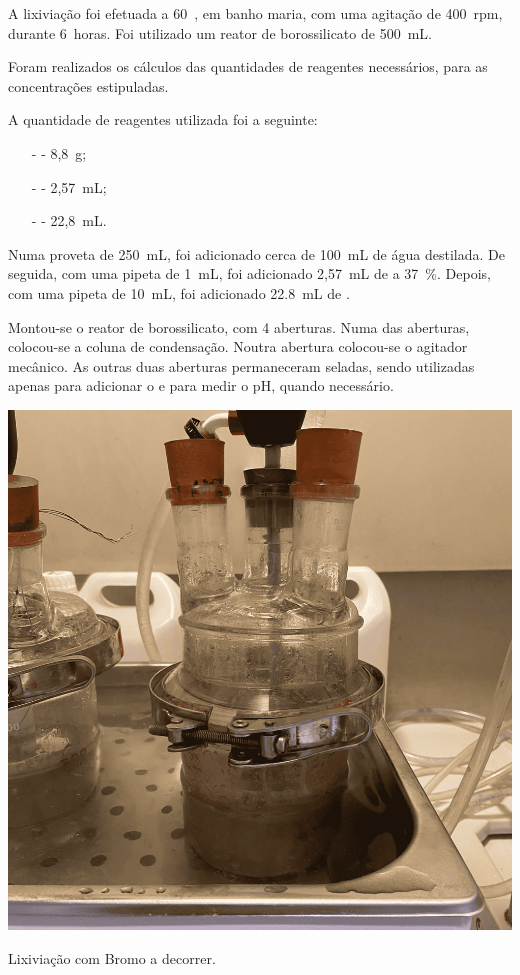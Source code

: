 {A lixiviação foi efetuada a 60~\graus{}, em banho maria, com uma agitação de 400~rpm, durante 6~horas.
Foi utilizado um reator de borossilicato de 500~mL.

Foram realizados os cálculos das quantidades de reagentes necessários, para as concentrações estipuladas. 

A quantidade de reagentes utilizada foi a seguinte:
\begin{itemize}
    \item[-] \bromo{} - 8,8~g;
    \item[-] \acl{} - 2,57~mL;
    \item[-] \hipso{} - 22,8~mL.
\end{itemize}

Numa proveta de 250~mL, foi adicionado cerca de 100~mL de água destilada.
De seguida, com uma pipeta de 1~mL, foi adicionado 2,57~mL de \acl{} a 37~\%.
Depois, com uma pipeta de 10~mL, foi adicionado 22.8~mL de \hipso{}.

Montou-se o reator de borossilicato, com 4 aberturas. 
Numa das aberturas, colocou-se a coluna de condensação. 
Noutra abertura colocou-se o agitador mecânico.
As outras duas aberturas permaneceram seladas, sendo utilizadas apenas para adicionar o \bromo{} e para medir o pH, quando necessário.

\begin{marginfigure}[-2cm]
    \centering
    \includegraphics[width=0.9\linewidth]{figures/lixiviação bromo.png}
    \caption{Lixiviação com Bromo a decorrer.}
    \label{fig:lixiacao-bromo}
\end{marginfigure}

}
